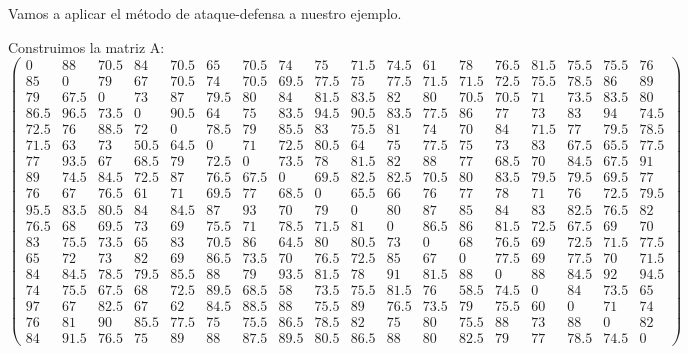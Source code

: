 \begin{ejem} Vamos a aplicar el método de ataque-defensa a nuestro ejemplo.\\
\end{ejem}	
	Construimos la matriz A:
{\tiny 	\[ %
	\left(\begin{array}{cccccccccccccccccc}
	0 & 88 & 70.5 & 84 & 70.5 & 65 & 70.5 & 74 & 75 & 71.5 & 74.5 & 61 & 78 & 76.5 & 81.5 & 75.5 & 75.5 & 76 \\
	85 & 0 & 79 & 67 & 70.5 & 74 & 70.5 & 69.5 & 77.5 & 75 & 77.5 & 71.5 & 71.5 & 72.5 & 75.5 & 78.5 & 86 & 89 \\
	79 & 67.5 & 0 & 73 & 87 & 79.5 & 80 & 84 & 81.5 & 83.5 & 82 & 80 & 70.5 & 70.5 & 71 & 73.5 & 83.5 & 80 \\
	86.5 & 96.5 & 73.5 & 0 & 90.5 & 64 & 75 & 83.5 & 94.5 & 90.5 & 83.5 & 77.5 & 86 & 77 & 73 & 83 & 94 & 74.5 \\
	72.5 & 76 & 88.5 & 72 & 0 & 78.5 & 79 & 85.5 & 83 & 75.5 & 81 & 74 & 70 & 84 & 71.5 & 77 & 79.5 & 78.5 \\
	71.5 & 63 & 73 & 50.5 & 64.5 & 0 & 71 & 72.5 & 80.5 & 64 & 75 & 77.5 & 75 & 73 & 83 & 67.5 & 65.5 & 77.5 \\
	77 & 93.5 & 67 & 68.5 & 79 & 72.5 & 0 & 73.5 & 78 & 81.5 & 82 & 88 & 77 & 68.5 & 70 & 84.5 & 67.5 & 91 \\
	89 & 74.5 & 84.5 & 72.5 & 87 & 76.5 & 67.5 & 0 & 69.5 & 82.5 & 82.5 & 70.5 & 80 & 83.5 & 79.5 & 79.5 & 69.5 & 77 \\
	76 & 67 & 76.5 & 61 & 71 & 69.5 & 77 & 68.5 & 0 & 65.5 & 66 & 76 & 77 & 78 & 71 & 76 & 72.5 & 79.5 \\
	95.5 & 83.5 & 80.5 & 84 & 84.5 & 87 & 93 & 70 & 79 & 0 & 80 & 87 & 85 & 84 & 83 & 82.5 & 76.5 & 82 \\
	76.5 & 68 & 69.5 & 73 & 69 & 75.5 & 71 & 78.5 & 71.5 & 81 & 0 & 86.5 & 86 & 81.5 & 72.5 & 67.5 & 69 & 70 \\
	83 & 75.5 & 73.5 & 65 & 83 & 70.5 & 86 & 64.5 & 80 & 80.5 & 73 & 0 & 68 & 76.5 & 69 & 72.5 & 71.5 & 77.5 \\
	65 & 72 & 73 & 82 & 69 & 86.5 & 73.5 & 70 & 76.5 & 72.5 & 85 & 67 & 0 & 77.5 & 69 & 77.5 & 70 & 71.5 \\
	84 & 84.5 & 78.5 & 79.5 & 85.5 & 88 & 79 & 93.5 & 81.5 & 78 & 91 & 81.5 & 88 & 0 & 88 & 84.5 & 92 & 94.5 \\
	74 & 75.5 & 67.5 & 68 & 72.5 & 89.5 & 68.5 & 58 & 73.5 & 75.5 & 81.5 & 76 & 58.5 & 74.5 & 0 & 84 & 73.5 & 65 \\
	97 & 67 & 82.5 & 67 & 62 & 84.5 & 88.5 & 88 & 75.5 & 89 & 76.5 & 73.5 & 79 & 75.5 & 60 & 0 & 71 & 74 \\
	76 & 81 & 90 & 85.5 & 77.5 & 75 & 75.5 & 86.5 & 78.5 & 82 & 75 & 80 & 75.5 & 88 & 73 & 88 & 0 & 82 \\
	84 & 91.5 & 76.5 & 75 & 89 & 88 & 87.5 & 89.5 & 80.5 & 86.5 & 88 & 80 & 82.5 & 79 & 77 & 78.5 & 74.5 & 0 	
	\end{array} \right) 
	\]}
	
